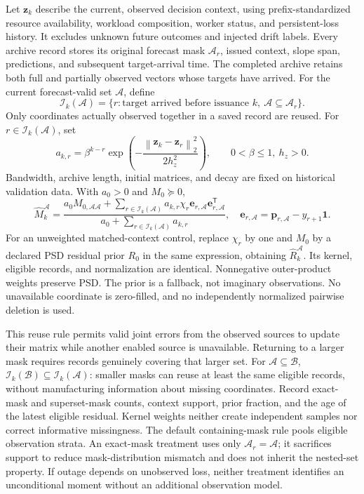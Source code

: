 \documentclass[10pt]{article}
\newcommand{\norm}[1]{\left\lVert #1\right\rVert}
\begin{document}
Let $\boldsymbol z_k$ describe the current, observed decision context, using
prefix-standardized resource availability, workload composition, worker status,
and persistent-loss history. It excludes unknown future outcomes and injected
drift labels. Every archive record stores its original forecast mask $\mathcal A_r$, issued
context, slope span, predictions, and subsequent target-arrival time. The
completed archive retains both full and partially observed vectors whose
targets have arrived. For the current forecast-valid set $\mathcal A$, define
\begin{equation}
 \mathcal I_k(\mathcal A)=
 \{r:\text{target arrived before issuance }k,\ \mathcal A\subseteq\mathcal A_r\}.
 \label{eq:mask-archive}
\end{equation}
Only coordinates actually observed together in a saved record are reused.
For $r\in\mathcal I_k(\mathcal A)$, set
\begin{equation}
 a_{k,r}=\beta^{k-r}
 \exp\left(-\frac{\norm{\boldsymbol z_k-\boldsymbol z_r}_2^2}
                 {2h_z^2}\right),\qquad 0<\beta\le1,\ h_z>0.
\end{equation}
Bandwidth, archive length, initial matrices, and decay are fixed on historical
validation data. With $a_0>0$ and $M_0\succeq0$,
\begin{equation}
 \widehat M_k^{\mathcal A}=
 \frac{a_0M_{0,\mathcal A\mathcal A}+
       \sum_{r\in\mathcal I_k(\mathcal A)}a_{k,r}\chi_r
       \boldsymbol e_{r,\mathcal A}\boldsymbol e_{r,\mathcal A}^{\mathsf T}}
      {a_0+\sum_{r\in\mathcal I_k(\mathcal A)}a_{k,r}},
 \quad \boldsymbol e_{r,\mathcal A}=
 \boldsymbol p_{r,\mathcal A}-y_{r+1}\boldsymbol1.
 \label{eq:context-moment}
\end{equation}
For an unweighted matched-context control, replace $\chi_r$ by one and
$M_0$ by a declared PSD residual prior $R_0$ in the same expression, obtaining
$\widehat R_k^{\mathcal A}$. Its kernel, eligible records, and normalization
are identical. Nonnegative outer-product weights preserve PSD. The prior is a
fallback, not imaginary observations. No unavailable coordinate is zero-filled,
and no independently normalized pairwise deletion is used.

This reuse rule permits valid joint errors from the observed sources to update
their matrix while another enabled source is unavailable. Returning to a larger
mask requires records genuinely covering that larger set. For
$\mathcal A\subseteq\mathcal B$,
$\mathcal I_k(\mathcal B)\subseteq\mathcal I_k(\mathcal A)$: smaller masks
can reuse at least the same eligible records, without manufacturing information
about missing coordinates. Record exact-mask and superset-mask counts, context
support, prior fraction, and the age of the latest eligible residual.
Kernel weights neither create independent samples nor correct informative
missingness. The default containing-mask rule pools eligible observation strata.
An exact-mask treatment uses only $\mathcal A_r=\mathcal A$; it sacrifices
support to reduce mask-distribution mismatch and does not inherit the nested-set
property. If outage depends on unobserved loss, neither treatment identifies an
unconditional moment without an additional observation model.
\end{document}
